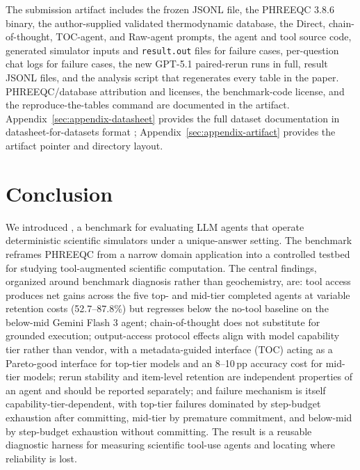 \documentclass{article}
\begin{document}
The submission artifact includes the frozen \BenchName{} JSONL file, the PHREEQC 3.8.6 binary, the author-supplied validated thermodynamic database, the Direct, chain-of-thought, TOC-agent, and Raw-agent prompts, the agent and tool source code, generated simulator inputs and \texttt{result.out} files for failure cases, per-question chat logs for failure cases, the new GPT-5.1 paired-rerun runs in full, result JSONL files, and the analysis script that regenerates every table in the paper. PHREEQC/database attribution and licenses, the benchmark-code license, and the reproduce-the-tables command are documented in the artifact. Appendix~\ref{sec:appendix-datasheet} provides the full dataset documentation in datasheet-for-datasets format \citep{gebru2021datasheets}; Appendix~\ref{sec:appendix-artifact} provides the artifact pointer and directory layout.

\section{Conclusion}

We introduced \BenchName, a benchmark for evaluating LLM agents that operate deterministic scientific simulators under a unique-answer setting. The benchmark reframes PHREEQC from a narrow domain application into a controlled testbed for studying tool-augmented scientific computation. The central findings, organized around benchmark diagnosis rather than geochemistry, are: tool access produces net gains across the five top- and mid-tier completed agents at variable retention costs (52.7--87.8\%) but regresses below the no-tool baseline on the below-mid Gemini Flash 3 agent; chain-of-thought does not substitute for grounded execution; output-access protocol effects align with model capability tier rather than vendor, with a metadata-guided interface (TOC) acting as a Pareto-good interface for top-tier models and an 8--10\,pp accuracy cost for mid-tier models; rerun stability and item-level retention are independent properties of an agent and should be reported separately; and failure mechanism is itself capability-tier-dependent, with top-tier failures dominated by step-budget exhaustion after committing, mid-tier by premature commitment, and below-mid by step-budget exhaustion without committing. The result is a reusable diagnostic harness for measuring scientific tool-use agents and locating where reliability is lost.



\end{document}
